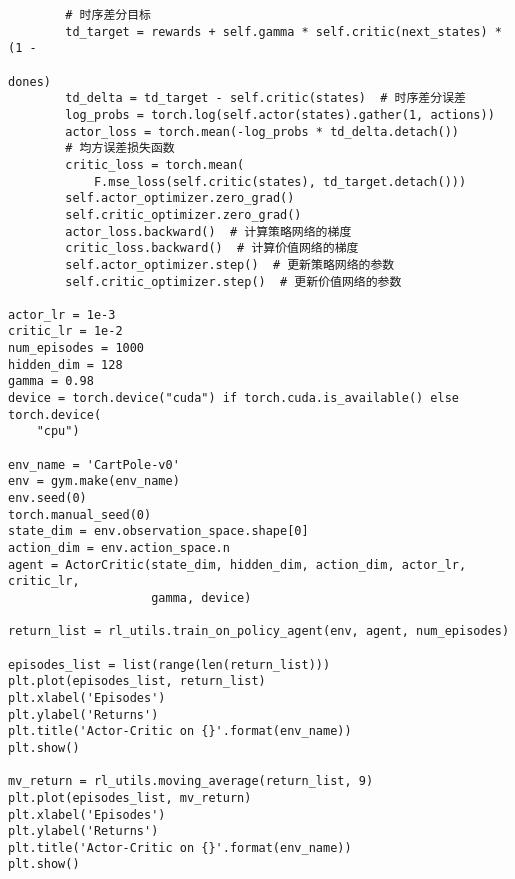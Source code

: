 \begin{lstlisting}
        # 时序差分目标
        td_target = rewards + self.gamma * self.critic(next_states) * (1 -
                                                                       dones)
        td_delta = td_target - self.critic(states)  # 时序差分误差
        log_probs = torch.log(self.actor(states).gather(1, actions))
        actor_loss = torch.mean(-log_probs * td_delta.detach())
        # 均方误差损失函数
        critic_loss = torch.mean(
            F.mse_loss(self.critic(states), td_target.detach()))
        self.actor_optimizer.zero_grad()
        self.critic_optimizer.zero_grad()
        actor_loss.backward()  # 计算策略网络的梯度
        critic_loss.backward()  # 计算价值网络的梯度
        self.actor_optimizer.step()  # 更新策略网络的参数
        self.critic_optimizer.step()  # 更新价值网络的参数

actor_lr = 1e-3
critic_lr = 1e-2
num_episodes = 1000
hidden_dim = 128
gamma = 0.98
device = torch.device("cuda") if torch.cuda.is_available() else torch.device(
    "cpu")

env_name = 'CartPole-v0'
env = gym.make(env_name)
env.seed(0)
torch.manual_seed(0)
state_dim = env.observation_space.shape[0]
action_dim = env.action_space.n
agent = ActorCritic(state_dim, hidden_dim, action_dim, actor_lr, critic_lr,
                    gamma, device)

return_list = rl_utils.train_on_policy_agent(env, agent, num_episodes)

episodes_list = list(range(len(return_list)))
plt.plot(episodes_list, return_list)
plt.xlabel('Episodes')
plt.ylabel('Returns')
plt.title('Actor-Critic on {}'.format(env_name))
plt.show()

mv_return = rl_utils.moving_average(return_list, 9)
plt.plot(episodes_list, mv_return)
plt.xlabel('Episodes')
plt.ylabel('Returns')
plt.title('Actor-Critic on {}'.format(env_name))
plt.show()
\end{lstlisting}

